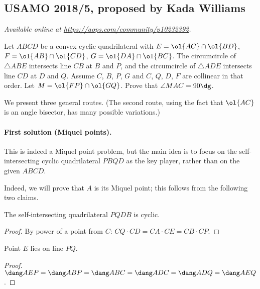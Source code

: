 \documentclass[11pt]{scrartcl}
\begin{document}
\subsection{USAMO 2018/5, proposed by Kada Williams}
\textsl{Available online at \url{https://aops.com/community/p10232392}.}
\begin{mdframed}[style=mdpurplebox,frametitle={Problem statement}]
Let $ABCD$ be a convex cyclic quadrilateral with
$E = \ol{AC} \cap \ol{BD}$, $F = \ol{AB} \cap \ol{CD}$,
$G = \ol{DA} \cap \ol{BC}$.
The circumcircle of $\triangle ABE$
intersects line $CB$ at $B$ and $P$,
and the circumcircle of $\triangle ADE$
intersects line $CD$ at $D$ and $Q$.
Assume $C$, $B$, $P$, $G$
and $C$, $Q$, $D$, $F$ are collinear in that order.
Let $M = \ol{FP} \cap \ol{GQ}$.
Prove that $\angle MAC = 90\dg$.
\end{mdframed}
We present three general routes.
(The second route, using the fact that $\ol{AC}$
is an angle bisector, has many possible variations.)

\paragraph{First solution (Miquel points).}
This is indeed a Miquel point problem,
but the main idea is to focus on the self-intersecting
cyclic quadrilateral $PBQD$ as the key player,
rather than on the given $ABCD$.

Indeed, we will prove that $A$ is its Miquel point;
this follows from the following two claims.
\begin{claim*}
  The self-intersecting quadrilateral $PQDB$ is cyclic.
\end{claim*}
\begin{proof}
  By power of a point from $C$:
  $CQ \cdot CD = CA \cdot CE = CB \cdot CP$.
\end{proof}
\begin{claim*}
  Point $E$ lies on line $PQ$.
\end{claim*}
\begin{proof}
  $\dang AEP = \dang ABP = \dang ABC = \dang ADC
  = \dang ADQ = \dang AEQ$.
\end{proof}
\end{document}
